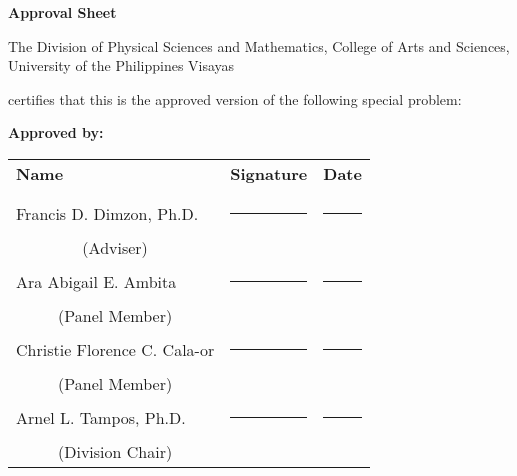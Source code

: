 \begin{center}
    \textbf{Approval Sheet}

    The Division of Physical Sciences and Mathematics, College of Arts and Sciences, University of the Philippines Visayas

    certifies that this is the approved version of the following special problem:

    \end{center}

    {\small\textbf{Approved by:}}

    \newcommand{\signaturerule}{\rule{10em}{.4pt}}
        \begin{tabular}{lll}
            \bfseries Name  & \bfseries Signature & \bfseries Date\\ \\
            Francis D. Dimzon, Ph.D. &\signaturerule  & \signaturerule\\
            \multicolumn{1}{c}{(Adviser)} \\
            Ara Abigail E. Ambita &\signaturerule &\signaturerule\\
            \multicolumn{1}{c}{(Panel Member)}  \\
            Christie Florence C. Cala-or  &\signaturerule &\signaturerule\\
            \multicolumn{1}{c}{(Panel Member)}  \\
            Arnel L. Tampos, Ph.D. &\signaturerule &\signaturerule\\
            \multicolumn{1}{c}{(Division Chair)}

        \end{tabular}

